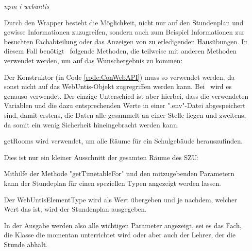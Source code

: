 \emph{npm i webuntis}

Durch den Wrapper besteht die Möglichkeit, nicht nur auf den Stundenplan und gewisse Informationen zuzugreifen, sondern auch zum Beispiel Informationen zur besuchten Fachabteilung oder das Anzeigen von zu erledigenden Hausübungen. In diesem Fall benötigt \ZELIA\ folgende Methoden, die teilweise mit anderen Methoden verwendet werden, um auf das Wunschergebnis zu kommen:



Der Konstruktor (in Code \ref{code:ConWebAPI}) muss so verwendet werden, da sonst nicht auf das WebUntis-Objekt zugregriffen werden kann. Bei \ZELIA\ wird es genauso verwendet. Der einzige Unterschied ist aber hierbei, dass die verwendeten Variablen und die dazu entsprechenden Werte in einer ".env"-Datei abgespeichert sind, damit erstens, die Daten alle gesammelt an einer Stelle liegen und zweitens, da somit ein wenig Sicherheit hineingebracht werden kann.


getRooms wird verwendet, um alle Räume für ein Schulgebäude herauszufinden.

\begin{minipage}{\textwidth}
    Dies ist nur ein kleiner Ausschnitt der gesamten Räume des SZU:
    
\end{minipage}

\begin{minipage}\textwidth
    Mithilfe der Methode "getTimetableFor" und den mitzugebenden Parametern kann der Stundeplan für einen speziellen Typen angezeigt werden lassen.
    
\end{minipage}


Der WebUntisElementType wird als Wert übergeben und je nachdem, welcher Wert das ist, wird der Stundenplan ausgegeben. 


In der Ausgabe werden also alle wichtigen Parameter angezeigt, sei es das Fach, die Klasse die momentan unterrichtet wird oder aber auch der Lehrer, der die Stunde abhält.

